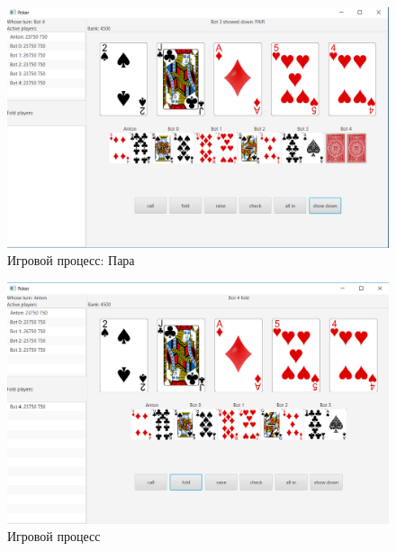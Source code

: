\begin{figure}[H]
	\begin{center}
		\includegraphics[scale=0.5]{pics/7.png}
	    \caption{Игровой процесс: Пара} 
		\label{pic:gui:6}
	\end{center}
\end{figure}

\begin{figure}[H]
	\begin{center}
		\includegraphics[scale=0.5]{pics/8.png}
	    \caption{Игровой процесс} 
		\label{pic:gui:6}
	\end{center}
\end{figure}

